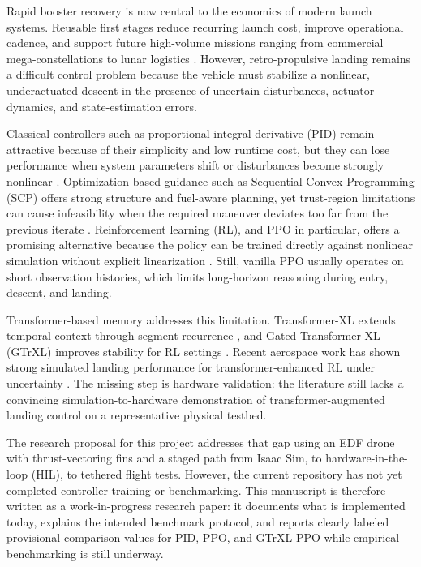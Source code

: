 \documentclass[10pt,twocolumn]{article}
\begin{document}
Rapid booster recovery is now central to the economics of modern launch systems. Reusable first stages reduce recurring launch cost, improve operational cadence, and support future high-volume missions ranging from commercial mega-constellations to lunar logistics \cite{bushnell2018}. However, retro-propulsive landing remains a difficult control problem because the vehicle must stabilize a nonlinear, underactuated descent in the presence of uncertain disturbances, actuator dynamics, and state-estimation errors.

Classical controllers such as proportional-integral-derivative (PID) remain attractive because of their simplicity and low runtime cost, but they can lose performance when system parameters shift or disturbances become strongly nonlinear \cite{konstantopoulos2020}. Optimization-based guidance such as Sequential Convex Programming (SCP) offers strong structure and fuel-aware planning, yet trust-region limitations can cause infeasibility when the required maneuver deviates too far from the previous iterate \cite{ackmese2007}. Reinforcement learning (RL), and PPO in particular, offers a promising alternative because the policy can be trained directly against nonlinear simulation without explicit linearization \cite{schulman2017}. Still, vanilla PPO usually operates on short observation histories, which limits long-horizon reasoning during entry, descent, and landing.

Transformer-based memory addresses this limitation. Transformer-XL extends temporal context through segment recurrence \cite{dai2019}, and Gated Transformer-XL (GTrXL) improves stability for RL settings \cite{parisotto2020}. Recent aerospace work has shown strong simulated landing performance for transformer-enhanced RL under uncertainty \cite{federici2024,carradori2025}. The missing step is hardware validation: the literature still lacks a convincing simulation-to-hardware demonstration of transformer-augmented landing control on a representative physical testbed.

The research proposal for this project addresses that gap using an EDF drone with thrust-vectoring fins and a staged path from Isaac Sim, to hardware-in-the-loop (HIL), to tethered flight tests. However, the current repository has not yet completed controller training or benchmarking. This manuscript is therefore written as a work-in-progress research paper: it documents what is implemented today, explains the intended benchmark protocol, and reports clearly labeled provisional comparison values for PID, PPO, and GTrXL-PPO while empirical benchmarking is still underway.
\end{document}
